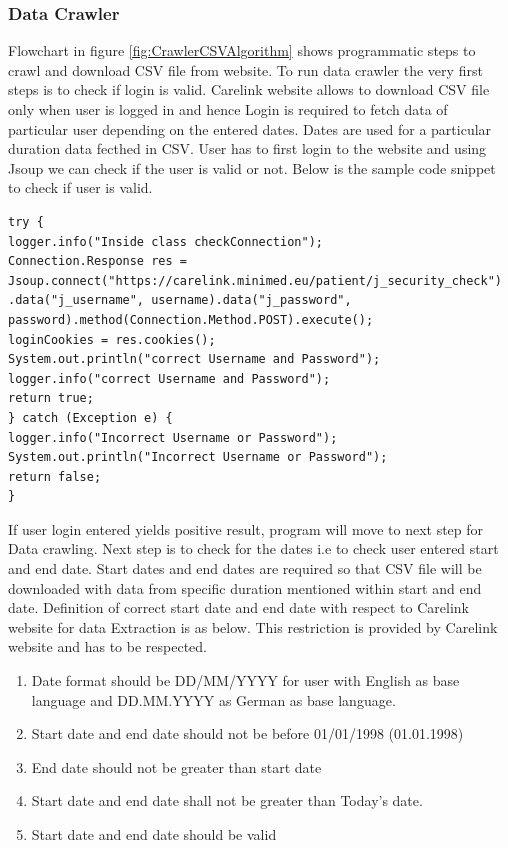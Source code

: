 \documentclass[article,type=msc,colorback,accentcolor=tud9c,twoside,11pt]{tudthesis}
\begin{document}
 
\subsubsection{Data Crawler}
\label{subsec:DataCrawler}
 Flowchart in figure \ref{fig:CrawlerCSVAlgorithm} shows programmatic steps to crawl and download CSV file from website. To run data crawler the very first steps is to check if login is valid. Carelink website allows to download CSV file only when user is logged in and hence Login is required to fetch data of particular user depending on the entered dates. Dates are used for a particular duration data fecthed in CSV. User has to first login to the website and using Jsoup we can check if the user is valid or not. Below is the sample code snippet to check if user is valid.
\begin{lstlisting}
try {
logger.info("Inside class checkConnection");
Connection.Response res = Jsoup.connect("https://carelink.minimed.eu/patient/j_security_check")
.data("j_username", username).data("j_password", password).method(Connection.Method.POST).execute();
loginCookies = res.cookies();
System.out.println("correct Username and Password");
logger.info("correct Username and Password");
return true;
} catch (Exception e) {
logger.info("Incorrect Username or Password");
System.out.println("Incorrect Username or Password");
return false;
}
\end{lstlisting}
If user login entered yields positive result, program will move to next step for Data crawling. Next step is to check for the dates i.e to check user entered start and end date. Start dates and end dates are required so that CSV file will be downloaded with data from specific duration mentioned within start and end date. Definition of correct start date and end date with respect to Carelink website for data Extraction is as below. This restriction is provided by Carelink website and has to be respected.
\begin{enumerate}
\item Date format should be DD/MM/YYYY for user with English as base language and DD.MM.YYYY as German as base language.
\item Start date and end date should not be before 01/01/1998 (01.01.1998)
\item End date should not be greater than start date
\item Start date and end date shall not be greater than Today's date.
\item Start date and end date should be valid
\end{enumerate}
\end{document}
